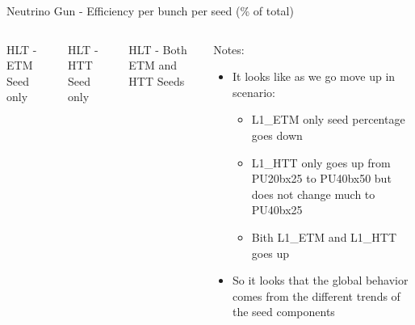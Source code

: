 \documentclass[8pt]{beamer}
\begin{document}
\begin{frame}{Neutrino Gun - Efficiency per bunch per seed (\% of total)}

\begin{columns}

\begin{block}{HLT - ETM Seed only}
\centering

\resizebox{1.0\linewidth}{!}{  }

\end{block}

\begin{block}{HLT - HTT Seed only}
\centering
 
\resizebox{1.0\linewidth}{!}{  }

\end{block}

\begin{block}{HLT - Both ETM and HTT Seeds}
\centering

\resizebox{1.0\linewidth}{!}{  }

\end{block}

\begin{block}{Notes:}
\centering

\begin{itemize}
  \item It looks like as we go move up in scenario:
  \begin{itemize}
    \item L1\_ETM only seed percentage goes down
    \item L1\_HTT only goes up from PU20bx25 to PU40bx50 but does not change much to PU40bx25
    \item Bith L1\_ETM and L1\_HTT goes up 
  \end{itemize}
  \item So it looks that the global behavior comes from the different trends of the seed components 
\end{itemize}


\end{block}

\end{columns}

\end{frame}
\end{document}
